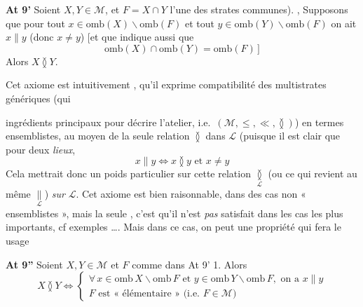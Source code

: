 \documentclass[11pt,a4paper]{article}
\begin{document}
\textbf{At \struck{\ill{}} 9'} Soient $X, Y \in \mathcal{M}$,  et $F = X \cap Y$  l'une des strates communes). ,  Supposons que pour tout $x \in \mathrm{omb}(X) \smallsetminus \mathrm{omb}(F)$ et tout $y \in \mathrm{omb}(Y) \smallsetminus \mathrm{omb}(F)$ on ait $x \parallel y$ (donc $x \neq y$) [et que \ill{} indique aussi que \struck{\ill{}}
\[
  \mathrm{omb}(X) \cap \mathrm{omb}(Y) = \mathrm{omb}(F) \,]
\]
Alors $X \between Y$.


Cet axiome est intuitivement \add{\ill{}}, qu'il exprime  \add{\uncertain{\ill{}}} compatibilité des multistrates génériques (qui \ill{} 


ingrédients principaux pour décrire l'atelier, i.e.\ $(\mathcal{M}, \leq, \ll, \between)$) en termes ensemblistes, au moyen de la seule relation $\between$ dans $\mathcal{L}$ (puisque \struck{\ill{}} il est clair que pour deux \emph{lieux},
\begin{equation}
  x \parallel y \Longleftrightarrow x \between y \text{ et } x \neq y \tag{1.59}
\end{equation}
 Cela mettrait donc un poids particulier sur cette relation $\underset{\mathcal{L}}{\between}$ (ou ce qui revient au même $\underset{\mathcal{L}}{\parallel}$)  \emph{sur} $\mathcal{L}$. Cet \struck{\ill{}}axiome est bien raisonnable,  dans des cas non « ensemblistes », mais la seule , c'est qu'il n'est \emph{pas} satisfait dans les cas  les plus importants, cf exemples \uncertain{\ill{}}\ldots. Mais dans ce cas, on peut  une  propriété qui fera le  usage

\textbf{At \struck{\ill{}} 9''} Soient $X, Y \in \mathcal{M}$ et $F$ comme dans At 9' 1. Alors
\[
  X \between Y \Longleftrightarrow
  \begin{cases}
    \forall\, x \in \mathrm{omb}\, X \smallsetminus \mathrm{omb}\, F \text{ et } y \in \mathrm{omb}\, Y \smallsetminus \mathrm{omb}\, F, \text{ on a } x \parallel y \\
    F \text{ est « élémentaire » (i.e. } F \in \mathcal{M} \text{)}
  \end{cases}
\]
\end{document}
